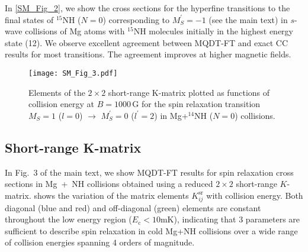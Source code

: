 \documentclass[reprint,amssymb,noeprint,twocolumn,longbibliography]{revtex4-2}
\begin{document}
In \cref{SM_Fig_2}, we show the cross sections for the hyperfine transitions to the final states of $^{15}$NH ($N=0$) corresponding to $M^\prime_S=-1$ (see the main text) in $s$-wave collisions of Mg atoms with  $^{15}$NH molecules initially in the highest energy state (12). We observe excellent agreement between MQDT-FT and exact CC results for most transitions. The agreement improves at higher magnetic fields.




\begin{figure}[t!]
\begin{center}
\texttt{[image: SM\_Fig\_3.pdf]}
\end{center}
\caption{Elements of the $2\times2$ short-range K-matrix plotted as functions of collision energy at  $B=1000$\,G for the spin relaxation transition $M_S=1$ ($l=0$) $\to$ $M^\prime_S=0$ ($l^\prime=2$) in Mg+$^{14}$NH ($N=0$) collisions. 
}
\label{SM_Fig_3}
\end{figure}

\begin{center}
\section{\label{sec:SM_Y} Short-range K-matrix}
\end{center}

In Fig.~3 of the main text, we show MQDT-FT results for  spin relaxation cross sections in Mg~+~NH collisions obtained using a reduced $2\times2$ short-range $K$-matrix.  shows the variation of the matrix elements $K_{ij}^\text{sr}$ with collision energy. Both diagonal (blue and red) and off-diagonal (green) elements are constant throughout the low energy region ($E_\text{c} < 10$mK), indicating that 3 parameters are sufficient to describe spin relaxation in cold Mg+NH collisions over a wide range of collision energies spanning 4 orders of magnitude.
\end{document}
